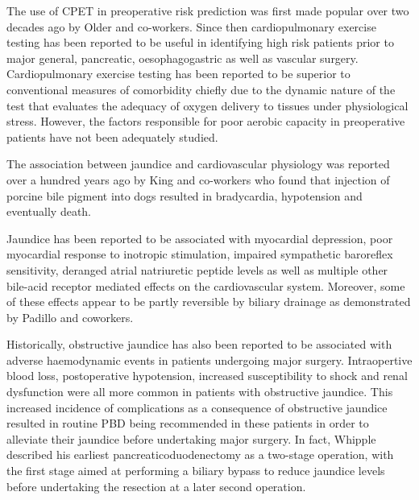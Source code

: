 The use of CPET in preoperative risk prediction was first made popular over two decades ago by Older and co-workers.\parencite{older_preoperative_1993} Since then cardiopulmonary exercise testing has been reported to be useful in identifying high risk patients prior to major general\parencite{snowden_submaximal_2010}, pancreatic\parencite{chandrabalan_pre-operative_2013,ausania_effects_2012}, oesophagogastric\parencite{nagamatsu_preoperative_2001} as well as vascular\parencite{carlisle_mid-term_2007} surgery. Cardiopulmonary exercise testing has been reported to be superior to conventional measures of comorbidity chiefly due to the dynamic nature of the test that evaluates the adequacy of oxygen delivery to tissues under physiological stress. However, the factors responsible for poor aerobic capacity in preoperative patients have not been adequately studied.

The association between jaundice and cardiovascular physiology was reported over a hundred years ago by King and co-workers who found that injection of porcine bile pigment into dogs resulted in bradycardia, hypotension and eventually death.\parencite{king_effect_1909}

Jaundice has been reported to be associated with myocardial depression\parencite{green_jaundiced_1986}, poor myocardial response to inotropic stimulation\parencite{lumlertgul_jaundiced_1991}, impaired sympathetic baroreflex sensitivity\parencite{song_baroreflex_2009}, deranged atrial natriuretic peptide levels\parencite{pereira_increased_1994,gallardo_increased_1998} as well as multiple other bile-acid receptor mediated effects on the cardiovascular system.\parencite{khurana_bile_2011} Moreover, some of these effects appear to be partly reversible by biliary drainage as demonstrated by Padillo and coworkers.\parencite{padillo_improved_2001}

Historically, obstructive jaundice has also been reported to be associated with adverse haemodynamic events in patients undergoing major surgery. Intraopertive blood loss, postoperative hypotension, increased susceptibility to shock and renal dysfunction were all more common in patients with obstructive jaundice. This increased incidence of complications as a consequence of obstructive jaundice resulted in routine PBD being recommended in these patients in order to alleviate their jaundice before undertaking major surgery. In fact, Whipple described his earliest pancreaticoduodenectomy as a two-stage operation, with the first stage aimed at performing a biliary bypass to reduce jaundice levels before undertaking the resection at a later second operation.

